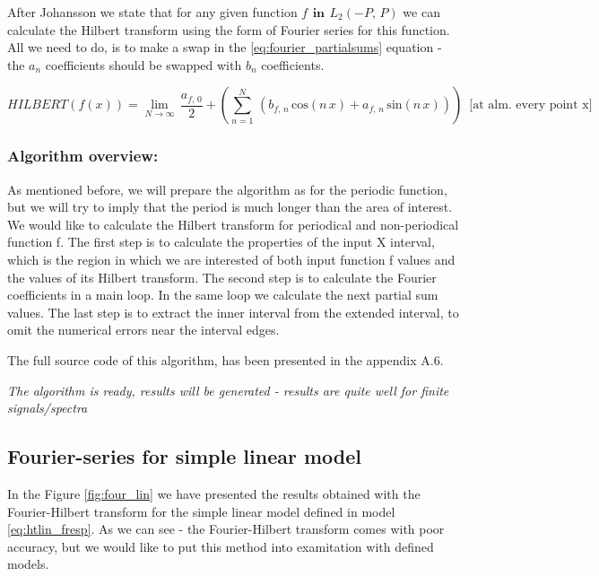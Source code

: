 \documentclass[12pt,twoside,a4paper]{article}
\numberwithin{equation}{subsection}
\numberwithin{figure}{subsection}
\begin{document}
After Johansson \cite{johansson_hilbert} we state that for any given function $f\,\ \textbf{in}\ \,{L_{2}}( - P, \,P)$ we can
calculate the Hilbert transform using the form of Fourier series for this function. All we need to do, is to make a swap in the
\ref{eq:fourier_partialsums} equation - the ${a_{n}}$ coefficients should be swapped with ${b_{n}}$ coefficients.

\begin{equation} \label{eq:fourier_hilbert}
  HILBERT(f(x)) = \lim_{N\rightarrow \infty }\,\frac {{a_{f, \,0}}}{2} + (\sum_{ n=1}^{N}\,({b_{f, \,n}}\,\mathrm{cos}(n\,x)
+ {a_{f, \,n}}\, \mathrm{sin}(n\,x)))\,\mbox{ [at alm. every point x] }
\end{equation}

\subsubsection*{Algorithm overview:}

As mentioned before, we will prepare the algorithm as for the periodic function, but we will try to imply that the period is much
longer than the area of interest. We would like to calculate the Hilbert transform for periodical and non-periodical
function f. The first step is to calculate the properties of the input X interval, which is the region in which we are interested
of both input function f values and the values of its Hilbert transform. The second step is to calculate the Fourier coefficients
in a main loop. In the same loop we calculate the next partial sum values. The last step is to extract the inner interval from the
extended interval, to omit the numerical errors near the interval edges.

The full source code of this algorithm, has been presented in the appendix A.6.

\textit{The algorithm is ready, results will be generated - results are quite well for finite signals/spectra}

\subsection{Fourier-series for simple linear model} \label{chap:fourier_lin}

In the Figure \ref{fig:four_lin} we have presented the results obtained with the Fourier-Hilbert transform for the simple
linear model defined in model \ref{eq:htlin_fresp}. As we can see - the Fourier-Hilbert transform comes with poor accuracy, but we
would like to put this method into examitation with defined models.
\end{document}
